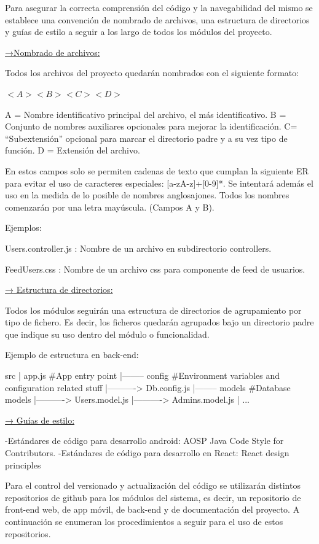 \documentclass{article}
\begin{document}
Para asegurar la correcta comprensión del código y la navegabilidad del mismo se establece una convención de nombrado de archivos, una estructura de directorios y guías de estilo a seguir a los largo de todos los módulos del proyecto.

\underline{→Nombrado de archivos:}

Todos los archivos del proyecto quedarán nombrados con el siguiente formato:

$<A><B><C><D>$

A = Nombre identificativo principal del archivo, el más identificativo.
B = Conjunto de nombres auxiliares opcionales para mejorar la identificación.
C= “Subextensión” opcional para marcar el directorio padre y a su vez tipo de función.
D = Extensión del archivo.

En estos campos solo se permiten cadenas de texto que cumplan la siguiente ER para evitar el uso de caracteres especiales: [a-zA-z]+[0-9]*.
Se intentará además el uso en la medida de lo posible de nombres anglosajones.
Todos los nombres comenzarán por una letra mayúscula. (Campos A y B).

Ejemplos: 

Users.controller.js : Nombre de un archivo en subdirectorio controllers.

FeedUsers.css :  Nombre de un archivo css para componente de feed de usuarios.
\pagebreak

\underline{→ Estructura de directorios:}

Todos los módulos seguirán una estructura de directorios de agrupamiento por tipo de fichero. Es decir, los ficheros quedarán agrupados bajo un directorio padre que indique su uso dentro del módulo o funcionalidad.

Ejemplo de estructura en back-end:

src
|	app.js	\#App entry point
|-------- config 	\#Environment variables and configuration related stuff
|----------> Db.config.js
|-------- models \#Database models
|----------> Users.model.js
|----------> Admins.model.js
| ...


\underline{→ Guías de estilo:}


-Estándares de código para desarrollo android: 
AOSP Java Code Style for Contributors.
-Estándares de código para desarrollo en React:
React design principles

Para el control del versionado y actualización del código se utilizarán distintos repositorios de github para los módulos del sistema, es decir, un repositorio de front-end web, de app móvil, de back-end y de documentación del proyecto. A continuación se enumeran los procedimientos a seguir para el uso de estos repositorios.
\end{document}
